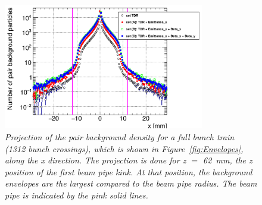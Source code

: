 \begin{figure}
\centering
\includegraphics[width=0.78\textwidth]{figures/HelixEnvelope_Projection_Comparison_250GeV_parametersets_LEG.png}
\caption{\textit{Projection of the pair background density for a full bunch train (1312 bunch crossings), which is shown in Figure~\ref{fig:Envelopes}, along the x direction.
The projection is done for z $=$ \SI{62}{\milli\meter}, the z position of the first beam pipe kink.
At that position, the background envelopes are the largest compared to the beam pipe radius.
The beam pipe is indicated by the pink solid lines.}}
\label{fig:Projection_Envelopes}
\end{figure}

